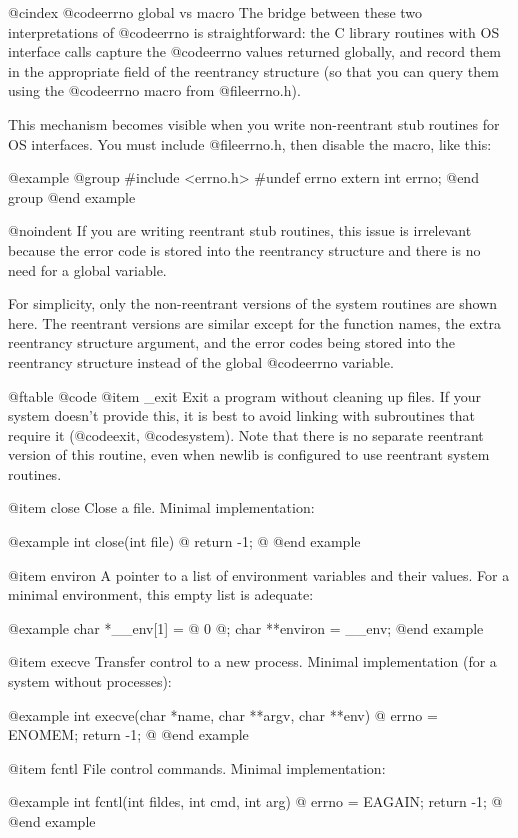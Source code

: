 @cindex @code{errno} global vs macro
The bridge between these two interpretations of @code{errno} is
straightforward: the C library routines with OS interface calls
capture the @code{errno} values returned globally, and record them in
the appropriate field of the reentrancy structure (so that you can query
them using the @code{errno} macro from @file{errno.h}).

This mechanism becomes visible when you write non-reentrant stub
routines for OS interfaces.  You must include @file{errno.h}, then
disable the macro, like this:

@example
@group
#include <errno.h>
#undef errno
extern int errno;
@end group
@end example

@noindent
If you are writing reentrant stub routines, this issue is irrelevant
because the error code is stored into the reentrancy structure and 
there is no need for a global variable.

For simplicity, only the non-reentrant versions of the system routines
are shown here.  The reentrant versions are similar except for
the function names, the extra reentrancy structure argument,
and the error codes being stored into the reentrancy structure
instead of the global @code{errno} variable.

@ftable @code
@item _exit
Exit a program without cleaning up files.  If your system doesn't
provide this, it is best to avoid linking with subroutines that require
it (@code{exit}, @code{system}).  Note that there is no separate
reentrant version of this routine, even when newlib is configured to use
reentrant system routines.

@item close
Close a file.  Minimal implementation:

@example
int close(int file) @{
  return -1;
@}
@end example

@item environ
A pointer to a list of environment variables and their values.  For a
minimal environment, this empty list is adequate:

@example
char *__env[1] = @{ 0 @};
char **environ = __env;
@end example

@item execve
Transfer control to a new process.  Minimal implementation (for a system
without processes):

@example
int execve(char *name, char **argv, char **env) @{
  errno = ENOMEM;
  return -1;
@}
@end example

@item fcntl
File control commands.  Minimal implementation:

@example
int fcntl(int fildes, int cmd, int arg) @{
  errno = EAGAIN;
  return -1;
@}
@end example

